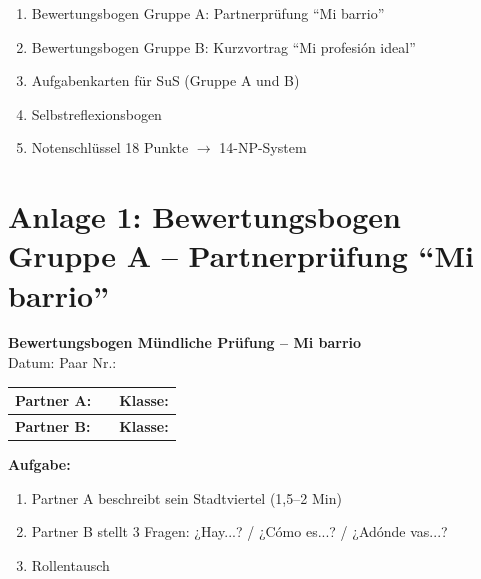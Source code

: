 \documentclass[11pt,a4paper]{article}
\begin{document}
\begin{enumerate}
    \item Bewertungsbogen Gruppe A: Partnerprüfung ``Mi barrio''
    \item Bewertungsbogen Gruppe B: Kurzvortrag ``Mi profesión ideal''
    \item Aufgabenkarten für SuS (Gruppe A und B)
    \item Selbstreflexionsbogen
    \item Notenschlüssel 18 Punkte $\rightarrow$ 14-NP-System
\end{enumerate}

\newpage

\section*{Anlage 1: Bewertungsbogen Gruppe A -- Partnerprüfung ``Mi barrio''}

\begin{center}
\textbf{\large Bewertungsbogen Mündliche Prüfung -- Mi barrio}\\[0.5em]
Datum: \underline{\hspace{2cm}} \hspace{2cm} Paar Nr.: \underline{\hspace{1cm}}
\end{center}

\vspace{0.5em}

\begin{tabular}{|l|c|c|}
\hline
\textbf{Partner A:} & \underline{\hspace{5cm}} & \textbf{Klasse:} \underline{\hspace{2cm}} \\
\hline
\textbf{Partner B:} & \underline{\hspace{5cm}} & \textbf{Klasse:} \underline{\hspace{2cm}} \\
\hline
\end{tabular}

\vspace{1em}

\textbf{Aufgabe:}
\begin{enumerate}
    \item Partner A beschreibt sein Stadtviertel (1,5--2 Min)
    \item Partner B stellt 3 Fragen: ¿Hay...? / ¿Cómo es...? / ¿Adónde vas...?
    \item Rollentausch
\end{enumerate}
\end{document}
